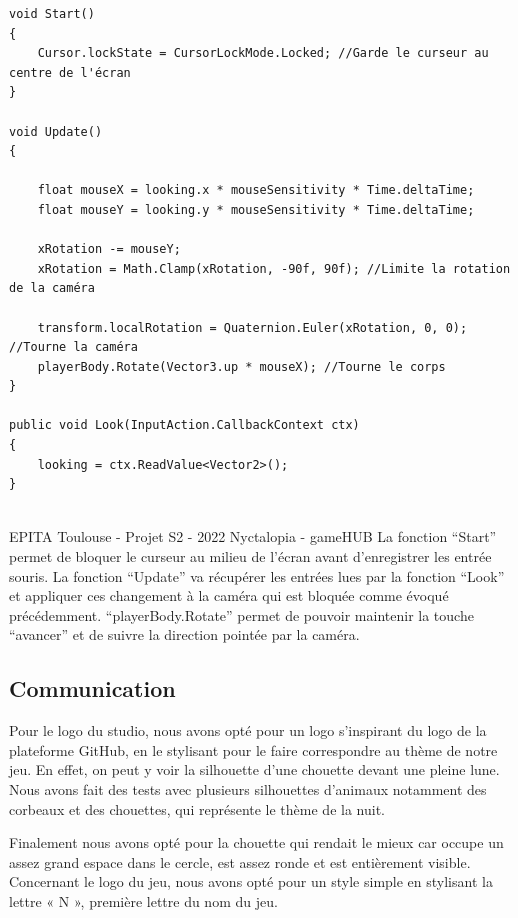\begin{lstlisting}[language={[Sharp]C}, caption={Fonction C\# Caméra}, label={ScriptCam}]
void Start()
{
    Cursor.lockState = CursorLockMode.Locked; //Garde le curseur au centre de l'écran
}
    
void Update()
{
        
    float mouseX = looking.x * mouseSensitivity * Time.deltaTime;
    float mouseY = looking.y * mouseSensitivity * Time.deltaTime;

    xRotation -= mouseY;
    xRotation = Math.Clamp(xRotation, -90f, 90f); //Limite la rotation de la caméra
        
    transform.localRotation = Quaternion.Euler(xRotation, 0, 0); //Tourne la caméra
    playerBody.Rotate(Vector3.up * mouseX); //Tourne le corps
}

public void Look(InputAction.CallbackContext ctx)
{
	looking = ctx.ReadValue<Vector2>();
}
\end{lstlisting}
\vfill
\noindent\makebox[\linewidth]{\rule{.8\paperwidth}{.6pt}}\\[0.2cm]
EPITA Toulouse - Projet S2 - 2022 \hfill Nyctalopia - gameHUB
\noindent\makebox[\linewidth]{\rule{.8\paperwidth}{.6pt}}
\newpage
La fonction ``Start'' permet de bloquer le curseur au milieu de l'écran avant d'enregistrer les entrée souris.
La fonction ``Update'' va récupérer les entrées lues par la fonction ``Look'' et appliquer ces changement à la caméra qui est bloquée comme évoqué précédemment.
``playerBody.Rotate'' permet de pouvoir maintenir la touche ``avancer'' et de suivre la direction pointée par la caméra.

\subsection{Communication}
\setlength{\parindent}{5ex}
Pour le logo du studio, nous avons opté pour un logo s’inspirant du logo de la plateforme GitHub, en le stylisant pour le faire correspondre au thème de notre jeu. En effet, on peut y voir la silhouette d’une chouette devant une pleine lune. Nous avons fait des tests avec plusieurs silhouettes d’animaux notamment des corbeaux et des chouettes, qui représente le thème de la nuit.


Finalement nous avons opté pour la chouette qui rendait le mieux car occupe un assez grand espace dans le cercle, est assez ronde et est entièrement visible.
Concernant le logo du jeu, nous avons opté pour un style simple en stylisant la lettre « N », première lettre du nom du jeu.


